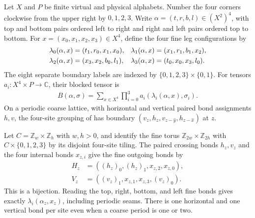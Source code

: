 
\begin{definition}%
    \label{def:peps_two_by_two_tensor}
    \leanok
    Let $X$ and $P$ be finite virtual and physical alphabets. Number the four
    corners clockwise from the upper right by $0,1,2,3$. Write
    $\alpha=(t,r,b,l)\in(X^2)^4$, with top and bottom pairs ordered left to
    right and right and left pairs ordered top to bottom. For
    $x=(x_0,x_1,x_2,x_3)\in X^4$, define the four fine leg configurations by
    \begin{align}
        \lambda_0(\alpha,x) & =(t_1,r_0,x_1,x_0),       &
        \lambda_1(\alpha,x) & =(x_1,r_1,b_1,x_2),\notag   \\
        \lambda_2(\alpha,x) & =(x_3,x_2,b_0,l_1),       &
        \lambda_3(\alpha,x) & =(t_0,x_0,x_3,l_0).
    \end{align}
    The eight separate boundary labels are indexed by
    $\{0,1,2,3\}\times\{0,1\}$. For tensors
    $a_i:X^4\times P\to\mathbb C$, their blocked tensor is
    \begin{align}
        B(\alpha,\sigma)=\sum_{x\in X^4}\prod_{i=0}^3
        a_i(\lambda_i(\alpha,x),\sigma_i).
    \end{align}
    On a periodic coarse lattice, with horizontal and vertical paired bond
    assignments $h,v$, the four-site grouping of
    \cite[Observation~6.6]{Schuch2010PEPS} has boundary
    $(v_z,h_z,v_{z-\hat y},h_{z-\hat x})$ at $z$.
\end{definition}

\begin{definition}%
    \label{def:peps_two_by_two_bond_bijection}
    \leanok
    Let $C=\mathbb Z_w\times\mathbb Z_h$ with $w,h>0$, and identify the fine
    torus $\mathbb Z_{2w}\times\mathbb Z_{2h}$ with $C\times\{0,1,2,3\}$
    by its disjoint four-site tiling. The paired crossing bonds $h_z,v_z$
    and the four internal bonds $x_{z,i}$ give the fine outgoing bonds by
    \begin{align}
        H_z & =((h_z)_0,(h_z)_1,x_{z,2},x_{z,0}), \\
        V_z & =((v_z)_1,x_{z,1},x_{z,3},(v_z)_0).
    \end{align}
    This is a bijection. Reading the top, right, bottom, and left fine
    bonds gives exactly $\lambda_i(\alpha_z,x_z)$, including periodic seams.
    There is one horizontal and one vertical bond per site even when a
    coarse period is one or two.
\end{definition}

